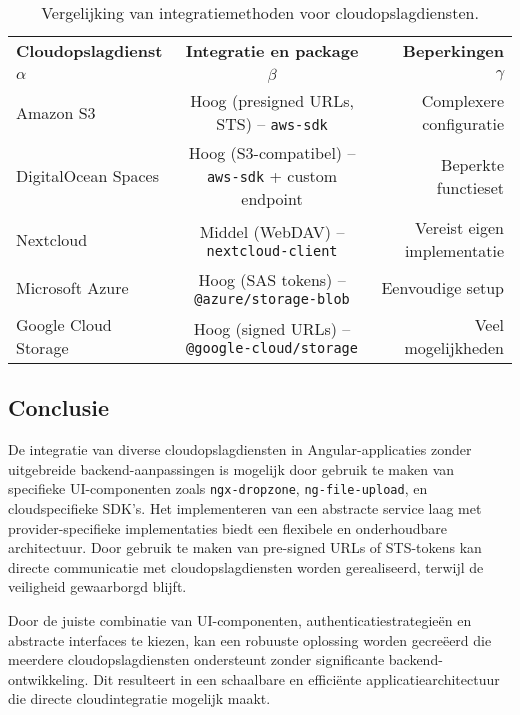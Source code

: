 \begin{table}
    \centering
    \begin{tabular}{lcr}
      \toprule
      \textbf{Cloudopslagdienst} & \textbf{Integratie en package} & \textbf{Beperkingen} \\
      $\alpha$ & $\beta$ & $\gamma$ \\
      \midrule
      Amazon S3 & Hoog (presigned URLs, STS) – \texttt{aws-sdk} & Complexere configuratie \\
      DigitalOcean Spaces & Hoog (S3-compatibel) – \texttt{aws-sdk} + custom endpoint & Beperkte functieset \\
      Nextcloud & Middel (WebDAV) – \texttt{nextcloud-client} & Vereist eigen implementatie \\
      Microsoft Azure & Hoog (SAS tokens) – \texttt{@azure/storage-blob} & Eenvoudige setup \\
      Google Cloud Storage & Hoog (signed URLs) – \texttt{@google-cloud/storage} & Veel mogelijkheden \\
      \bottomrule
    \end{tabular}
    \caption[Vergelijking cloudintegraties]{\label{tab:cloud-vergelijking}Vergelijking van integratiemethoden voor cloudopslagdiensten.}
 \end{table}

\subsection{Conclusie}

De integratie van diverse cloudopslagdiensten in Angular-applicaties zonder uitgebreide backend-aanpassingen is mogelijk door gebruik te maken van specifieke UI-componenten zoals \texttt{ngx-dropzone}, \texttt{ng-file-upload}, en cloudspecifieke SDK's. Het implementeren van een abstracte service laag met provider-specifieke implementaties biedt een flexibele en onderhoudbare architectuur. Door gebruik te maken van pre-signed URLs of STS-tokens kan directe communicatie met cloudopslagdiensten worden gerealiseerd, terwijl de veiligheid gewaarborgd blijft.

Door de juiste combinatie van UI-componenten, authenticatiestrategieën en abstracte interfaces te kiezen, kan een robuuste oplossing worden gecreëerd die meerdere cloudopslagdiensten ondersteunt zonder significante backend-ontwikkeling. Dit resulteert in een schaalbare en efficiënte applicatiearchitectuur die directe cloudintegratie mogelijk maakt.
